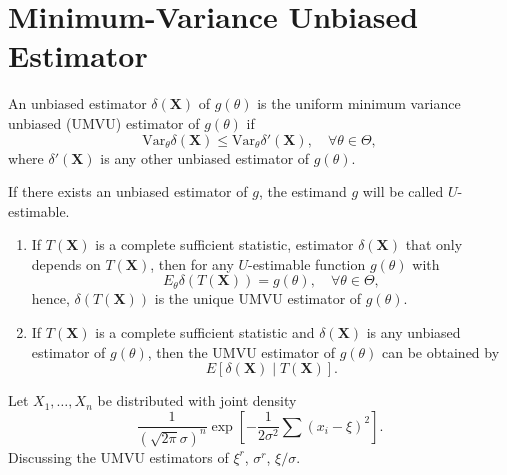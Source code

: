 \chapter{Minimum-Variance Unbiased Estimator}

\begin{definition}
    An unbiased estimator $\delta(\textbf{X})$ of $g(\theta)$ is the uniform minimum variance unbiased (UMVU) estimator of $g(\theta)$ if
    \begin{equation}
        \text{Var}_{\theta}\delta(\textbf{X})\leq\text{Var}_{\theta}\delta'(\textbf{X}),\quad\forall\theta\in\Theta,
    \end{equation}
    where $\delta'(\textbf{X})$ is any other unbiased estimator of $g(\theta)$.
\end{definition}

\begin{remark}
    If there exists an unbiased estimator of $g$, the estimand $g$ will be called $U$-estimable.
\end{remark}

\begin{enumerate}
    \item If $T(\textbf{X})$ is a complete sufficient statistic, estimator $\delta(\textbf{X})$ that only depends on $T(\textbf{X})$, then for any $U$-estimable function $g(\theta)$ with
          \begin{equation}
              E_{\theta}\delta(T(\textbf{X}))=g(\theta),\quad\forall\theta\in\Theta,
          \end{equation}
          hence, $\delta(T(\textbf{X}))$ is the unique UMVU estimator of $g(\theta)$.
    \item If $T(\textbf{X})$ is a complete sufficient statistic and $\delta({\textbf{X}})$ is any unbiased estimator of $g(\theta)$, then the UMVU estimator of $g(\theta)$ can be obtained by
          \begin{equation}
              E\left[\delta(\textbf{X})\mid T(\textbf{X})\right].
          \end{equation}
\end{enumerate}

\begin{example}
    Let $X_{1},\ldots,X_{n}$ be distributed with joint density
    \begin{equation}
        \frac{1}{(\sqrt{2\pi}\sigma)^{n}}\exp\left[-\frac{1}{2\sigma^{2}}\sum\left(x_{i}-\xi\right)^{2}\right].
    \end{equation}
    Discussing the UMVU estimators of $\xi^r$, $\sigma^r$, $\xi/\sigma$.
\end{example}

